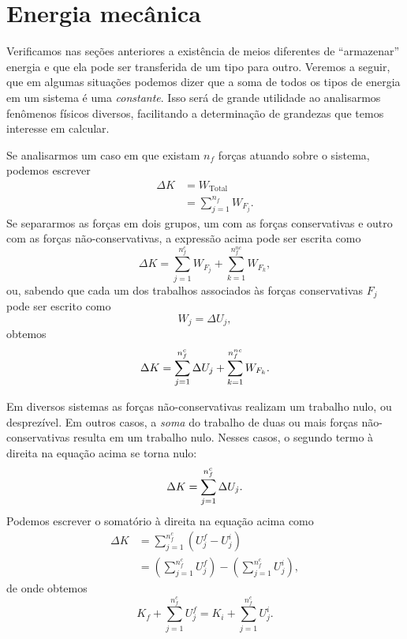 \section{Energia mecânica}
\label{Sec:EnergiaMecanica}


Verificamos nas seções anteriores a existência de meios diferentes de ``armazenar'' energia e que ela pode ser transferida de um tipo para outro. Veremos a seguir, que em algumas situações podemos dizer que a soma de todos os tipos de energia em um sistema é uma \emph{constante}. Isso será de grande utilidade ao analisarmos fenômenos físicos diversos, facilitando a determinação de grandezas que temos interesse em calcular.

Se analisarmos um caso em que existam $n_f$ forças atuando sobre o sistema, podemos escrever
\begin{align}
  \Delta K &= W_{\textrm{Total}} \\
  &= \sum_{j = 1}^{n_f} W_{F_j}.
\end{align}
%
Se separarmos as forças em dois grupos, um com as forças conservativas e outro com as forças não-conservativas, a expressão acima pode ser escrita como
\begin{equation}
    \Delta K = \sum_{j = 1}^{n_f^{c}} W_{F_j} + \sum_{k = 1}^{n_f^{nc}} W_{F_k},
\end{equation}
%
ou, sabendo que cada um dos trabalhos associados às forças conservativas $F_j$ pode ser escrito como
\begin{equation}
  W_j = \Delta U_j,
\end{equation}
%
obtemos
\begin{equation}
  \Delta K = \sum_{j = 1}^{n_f^c} \Delta U_j + \sum_{k = 1}^{n_f^{nc}} W_{F_k}. \\
\end{equation}

Em diversos sistemas as forças não-conservativas realizam um trabalho nulo, ou desprezível. Em outros casos, a \emph{soma} do trabalho de duas ou mais forças não-conservativas resulta em um trabalho nulo. Nesses casos, o segundo termo à direita na equação acima se torna nulo:
\begin{equation}
  \Delta K = \sum_{j = 1}^{n_f^c} \Delta U_j. \label{Eq:TeoremTrabEnergiaSohConservativas}\\
\end{equation}
%
Podemos escrever o somatório à direita na equação acima como
\begin{align}
  \Delta K &= \sum_{j = 1}^{n_f^c} (U_j^f - U_j^i) \\
  &= \left(\sum_{j = 1}^{n_f^c} U_j^f\right) - \left(\sum_{j = 1}^{n_f^c} U_j^i\right),
\end{align}
%
de onde obtemos
\begin{equation}
  K_f + \sum_{j = 1}^{n_f^c} U_j^f = K_i + \sum_{j = 1}^{n_f^c} U_j^i.
\end{equation}

